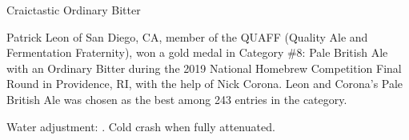 \stylesection{\stylestandardordinarybitter}

\begin{recipie}{Craictastic Ordinary Bitter}

\begin{aboutblock}
Patrick Leon of San Diego, CA, member of the QUAFF (Quality Ale and Fermentation
Fraternity), won a gold medal in Category \#8: Pale British Ale with an Ordinary
Bitter during the 2019 National Homebrew Competition Final Round in Providence,
RI, with the help of Nick Corona. Leon and Corona's Pale British Ale was chosen as
the best among 243 entries in the category. \sourceaha
\end{aboutblock}


\begin{methodandtiming}
 
\begin{mashsteps}
\end{mashsteps}

\begin{fermentationsteps}
\end{fermentationsteps}

\begin{directions}
Water adjustment: . Cold crash when fully
attenuated.
\end{directions}

\end{methodandtiming}

\pagebreak

\begin{ingredientsblock}

\begin{malts}
\end{malts}

\begin{hops}
\end{hops}


\end{ingredientsblock}

\end{recipie}

